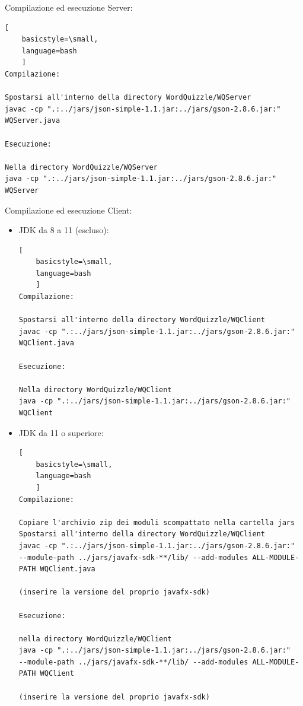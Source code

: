 \documentclass{article}
\begin{document}
Compilazione ed esecuzione Server:
\begin{lstlisting}[
    basicstyle=\small,
    language=bash
    ]
Compilazione:

Spostarsi all'interno della directory WordQuizzle/WQServer
javac -cp ".:../jars/json-simple-1.1.jar:../jars/gson-2.8.6.jar:" WQServer.java

Esecuzione:

Nella directory WordQuizzle/WQServer
java -cp ".:../jars/json-simple-1.1.jar:../jars/gson-2.8.6.jar:" WQServer
\end{lstlisting}
\clearpage
Compilazione ed esecuzione Client:
\begin{itemize}
\item JDK da 8 a 11 (escluso):
\begin{lstlisting}[
    basicstyle=\small,
    language=bash
    ]
Compilazione:

Spostarsi all'interno della directory WordQuizzle/WQClient
javac -cp ".:../jars/json-simple-1.1.jar:../jars/gson-2.8.6.jar:" WQClient.java

Esecuzione:

Nella directory WordQuizzle/WQClient
java -cp ".:../jars/json-simple-1.1.jar:../jars/gson-2.8.6.jar:" WQClient
\end{lstlisting}
\item JDK da 11 o superiore:
\begin{lstlisting}[
    basicstyle=\small,
    language=bash
    ]
Compilazione:

Copiare l'archivio zip dei moduli scompattato nella cartella jars
Spostarsi all'interno della directory WordQuizzle/WQClient
javac -cp ".:../jars/json-simple-1.1.jar:../jars/gson-2.8.6.jar:" 
--module-path ../jars/javafx-sdk-**/lib/ --add-modules ALL-MODULE-PATH WQClient.java

(inserire la versione del proprio javafx-sdk)

Esecuzione:

nella directory WordQuizzle/WQClient
java -cp ".:../jars/json-simple-1.1.jar:../jars/gson-2.8.6.jar:" 
--module-path ../jars/javafx-sdk-**/lib/ --add-modules ALL-MODULE-PATH WQClient

(inserire la versione del proprio javafx-sdk)
\end{lstlisting}
\end{itemize}

\clearpage
\end{document}
